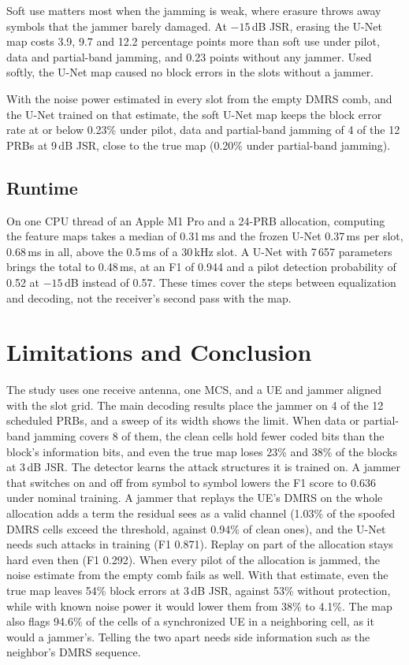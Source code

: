 \documentclass[conference]{IEEEtran}
\begin{document}
Soft use matters most when the jamming is weak, where erasure throws away symbols that the jammer
barely damaged. At $-15$\,dB JSR, erasing the U-Net map costs 3.9, 9.7 and 12.2 percentage points
more than soft use under pilot, data and partial-band jamming, and 0.23 points without any
jammer. Used softly, the U-Net map caused no block errors in the slots without a jammer.

With the noise power estimated in every slot from the empty DMRS comb, and the U-Net trained on
that estimate, the soft U-Net map keeps the block error rate at or below 0.23\% under pilot, data
and partial-band jamming of 4 of the 12 PRBs at 9\,dB JSR, close to the true map (0.20\% under
partial-band jamming).

\subsection{Runtime}
On one CPU thread of an Apple M1 Pro and a 24-PRB allocation, computing the feature maps takes a
median of 0.31\,ms and the frozen U-Net 0.37\,ms per slot, 0.68\,ms in all, above the 0.5\,ms of a
30\,kHz slot. A U-Net with 7\,657 parameters brings the total to 0.48\,ms, at an F1 of 0.944 and a
pilot detection probability of 0.52 at $-15$\,dB instead of 0.57. These times cover the steps
between equalization and decoding, not the receiver's second pass with the map.

\section{Limitations and Conclusion}

The study uses one receive antenna, one MCS, and a UE and jammer aligned with the slot grid. The
main decoding results place the jammer on 4 of the 12 scheduled PRBs, and a sweep of its width
shows the limit. When data or partial-band jamming covers 8 of them, the clean cells hold fewer coded bits than the block's information bits, and even
the true map loses 23\% and 38\% of the blocks at 3\,dB JSR. The detector learns the attack
structures it is trained on. A jammer that switches on and off from symbol to symbol lowers the F1
score to 0.636 under nominal training. A jammer that replays the UE's DMRS on the whole allocation
adds a term the residual sees as a valid channel (1.03\% of the spoofed DMRS cells exceed the
threshold, against 0.94\% of clean ones), and the U-Net needs such attacks in training (F1 0.871).
Replay on part of the allocation stays hard even then (F1 0.292). When every pilot of the
allocation is jammed, the noise estimate from the empty comb fails as well. With that estimate,
even the true map leaves 54\% block errors at 3\,dB JSR, against 53\% without protection, while
with known noise power it would lower them from 38\% to 4.1\%. The map also flags 94.6\% of the
cells of a synchronized UE in a neighboring cell, as it would a jammer's. Telling the two apart
needs side information such as the neighbor's DMRS sequence.
\end{document}
